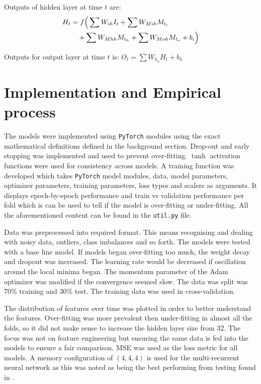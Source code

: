 \documentclass[conference]{IEEEtran}
\begin{document}
Outputs of hidden layer at time $t$ are:
\begin{align*}
	H_{t} &= f\Big( \sum W_{ih} I_{t} + \sum W_{Mi h} M_{t_i} \notag \\
	&\quad + \sum W_{Mh h} M_{t_h} + \sum W_{Mo h} M_{t_o} + b_{i} \Big)
\end{align*}

Outputs for output layer at time $t$ is: $O_{t} = \sum W_{h_o} H_{t} + b_{h}$






\section{Implementation and Empirical process}


The models were implemented using \texttt{PyTorch} modules using the exact mathematical definitions defined in the background section. Drop-out and early stopping was implemented and used to prevent over-fitting. $\tanh$ activation functions were used for consistency across models. A training function was developed which takes \texttt{PyTorch} model modules, data, model parameters, optimizer parameters, training parameters, loss types and scalers as arguments. It displays epoch-by-epoch performance and train vs validation performance per fold which is can be used to tell if the model is over-fitting or under-fitting. All the aforementioned content can be found in the \texttt{util.py} file.





Data was preprocessed into required format. This means recognising and dealing with noisy data, outliers, class imbalances and so forth. The models were tested with a base line model. If models began over-fitting too much, the weight decay and dropout was increased. The learning rate would be decreased if oscillation around the local minima began. The momentum parameter of the Adam optimizer was modified if the convergence seemed slow. The data was split was 70\% training and 30\% test. The training data was used in cross-validation.

The distribution of features over time was plotted in order to better understand the features. Over-fitting was more prevalent then under-fitting in almost all the folds, so it did not make sense to increase the hidden layer size from 32. The focus was not on feature engineering but ensuring the same data is fed into the models to ensure a fair comparison. MSE was used as the loss metric for all models. A memory configuration of $(4,4,4)$ is used for the multi-recurrent neural network as this was noted as being the best performing from testing found in \cite{10.5555/AAI29191757}.
\end{document}
